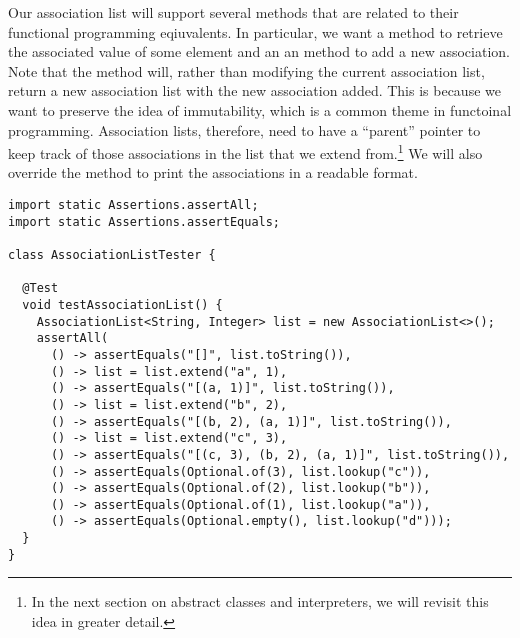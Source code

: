 Our association list will support several methods that are related to their functional programming eqiuvalents. In particular, we want a  method to retrieve the associated value of some element and an an  method to add a new association. Note that the  method will, rather than modifying the current association list, return a new association list with the new association added. This is because we want to preserve the idea of immutability, which is a common theme in functoinal programming. Association lists, therefore, need to have a ``parent'' pointer to keep track of those associations in the list that we extend from.\footnote{In the next section on abstract classes and interpreters, we will revisit this idea in greater detail.} We will also override the  method to print the associations in a readable format. 

\begin{lstlisting}[language=MyJava]
import static Assertions.assertAll;
import static Assertions.assertEquals;

class AssociationListTester {

  @Test
  void testAssociationList() {
    AssociationList<String, Integer> list = new AssociationList<>();
    assertAll(
      () -> assertEquals("[]", list.toString()),
      () -> list = list.extend("a", 1),
      () -> assertEquals("[(a, 1)]", list.toString()),
      () -> list = list.extend("b", 2),
      () -> assertEquals("[(b, 2), (a, 1)]", list.toString()),
      () -> list = list.extend("c", 3),
      () -> assertEquals("[(c, 3), (b, 2), (a, 1)]", list.toString()),
      () -> assertEquals(Optional.of(3), list.lookup("c")),
      () -> assertEquals(Optional.of(2), list.lookup("b")),
      () -> assertEquals(Optional.of(1), list.lookup("a")),
      () -> assertEquals(Optional.empty(), list.lookup("d")));
  }
}
\end{lstlisting}

